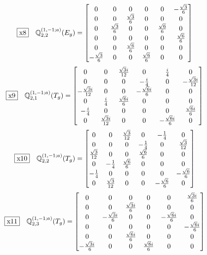 \documentclass[fleqn,10pt,landscape]{jsarticle}
\begin{document}
\begin{dmath*}
\fbox{x8}\quad \mathbb{Q}_{2,2}^{(1,-1;a)}(E_{g})=\begin{bmatrix} 0 & 0 & 0 & 0 & 0 & - \frac{\sqrt{3}}{6} \\ 0 & 0 & \frac{\sqrt{3}}{6} & 0 & 0 & 0 \\ 0 & \frac{\sqrt{3}}{6} & 0 & 0 & \frac{\sqrt{6}}{6} & 0 \\ 0 & 0 & 0 & 0 & 0 & \frac{\sqrt{6}}{6} \\ 0 & 0 & \frac{\sqrt{6}}{6} & 0 & 0 & 0 \\ - \frac{\sqrt{3}}{6} & 0 & 0 & \frac{\sqrt{6}}{6} & 0 & 0 \end{bmatrix}
\end{dmath*}
\begin{dmath*}
\fbox{x9}\quad \mathbb{Q}_{2,1}^{(1,-1;a)}(T_{g})=\begin{bmatrix} 0 & 0 & \frac{\sqrt{3} i}{12} & 0 & \frac{i}{4} & 0 \\ 0 & 0 & 0 & - \frac{i}{4} & 0 & - \frac{\sqrt{3} i}{12} \\ - \frac{\sqrt{3} i}{12} & 0 & 0 & - \frac{\sqrt{6} i}{6} & 0 & 0 \\ 0 & \frac{i}{4} & \frac{\sqrt{6} i}{6} & 0 & 0 & 0 \\ - \frac{i}{4} & 0 & 0 & 0 & 0 & \frac{\sqrt{6} i}{6} \\ 0 & \frac{\sqrt{3} i}{12} & 0 & 0 & - \frac{\sqrt{6} i}{6} & 0 \end{bmatrix}
\end{dmath*}
\begin{dmath*}
\fbox{x10}\quad \mathbb{Q}_{2,2}^{(1,-1;a)}(T_{g})=\begin{bmatrix} 0 & 0 & \frac{\sqrt{3}}{12} & 0 & - \frac{1}{4} & 0 \\ 0 & 0 & 0 & - \frac{1}{4} & 0 & \frac{\sqrt{3}}{12} \\ \frac{\sqrt{3}}{12} & 0 & 0 & \frac{\sqrt{6}}{6} & 0 & 0 \\ 0 & - \frac{1}{4} & \frac{\sqrt{6}}{6} & 0 & 0 & 0 \\ - \frac{1}{4} & 0 & 0 & 0 & 0 & - \frac{\sqrt{6}}{6} \\ 0 & \frac{\sqrt{3}}{12} & 0 & 0 & - \frac{\sqrt{6}}{6} & 0 \end{bmatrix}
\end{dmath*}
\begin{dmath*}
\fbox{x11}\quad \mathbb{Q}_{2,3}^{(1,-1;a)}(T_{g})=\begin{bmatrix} 0 & 0 & 0 & 0 & 0 & \frac{\sqrt{3} i}{6} \\ 0 & 0 & \frac{\sqrt{3} i}{6} & 0 & 0 & 0 \\ 0 & - \frac{\sqrt{3} i}{6} & 0 & 0 & - \frac{\sqrt{6} i}{6} & 0 \\ 0 & 0 & 0 & 0 & 0 & - \frac{\sqrt{6} i}{6} \\ 0 & 0 & \frac{\sqrt{6} i}{6} & 0 & 0 & 0 \\ - \frac{\sqrt{3} i}{6} & 0 & 0 & \frac{\sqrt{6} i}{6} & 0 & 0 \end{bmatrix}
\end{dmath*}
\end{document}
